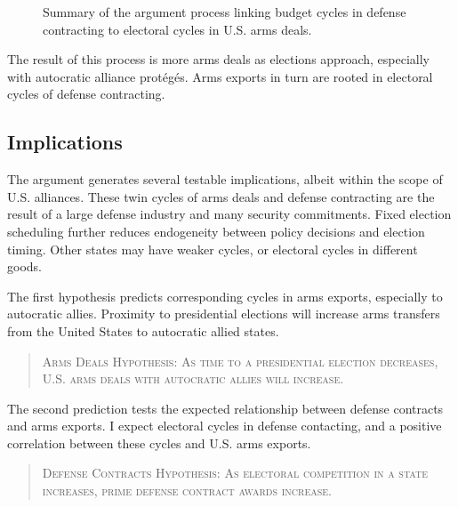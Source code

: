 \documentclass[12pt]{article}
\begin{document}
\begin{figure}[htpb]
\caption{Summary of the argument process linking budget cycles in defense contracting to electoral cycles in U.S. arms deals.}
\label{fig:arg-process}
\end{figure}



The result of this process is more arms deals as elections approach, especially with autocratic alliance prot{\'e}g{\'e}s.
Arms exports in turn are rooted in electoral cycles of defense contracting.



\subsection{Implications}



The argument generates several testable implications, albeit within the scope of U.S. alliances. 
These twin cycles of arms deals and defense contracting are the result of a large defense industry and many security commitments.
Fixed election scheduling further reduces endogeneity between policy decisions and election timing. 
Other states may have weaker cycles, or electoral cycles in different goods.


The first hypothesis predicts corresponding cycles in arms exports, especially to autocratic allies.
Proximity to presidential elections will increase arms transfers from the United States to autocratic allied states. 


\begin{quote}
\textsc{Arms Deals Hypothesis: As time to a presidential election decreases, U.S. arms deals with autocratic allies will increase.}
\end{quote}


The second prediction tests the expected relationship between defense contracts and arms exports. 
I expect electoral cycles in defense contacting, and a positive correlation between these cycles and U.S. arms exports.


\begin{quote}
\textsc{Defense Contracts Hypothesis: As electoral competition in a state increases, prime defense contract awards increase.}
\end{quote}
\end{document}
